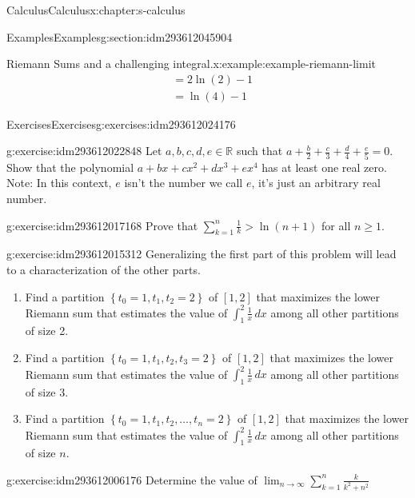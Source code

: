 \documentclass[twoside,10pt,]{book}
\numberwithin{equation}{section}
\begin{document}
\begin{chapterptx}{Calculus}{}{Calculus}{}{}{x:chapter:s-calculus}
\begin{sectionptx}{Examples}{}{Examples}{}{}{g:section:idm293612045904}
\begin{example}{Riemann Sums and a challenging integral.}{x:example:example-riemann-limit}
\begin{equation*}
\begin{split}
& = 2 \ln(2) - 1\\
& = \ln(4) - 1
\end{split}
\end{equation*}
%
\end{example}
\end{sectionptx}
%
%
\typeout{************************************************}
\typeout{************************************************}
%
\begin{exercises-section}{Exercises}{}{Exercises}{}{}{g:exercises:idm293612024176}
\begin{divisionexercise}{1}{}{}{g:exercise:idm293612022848}%
Let \(a,b,c,d,e \in \mathbb{R}\) such that \(a + \frac{b}{2} + \frac{c}{3} + \frac{d}{4} + \frac{e}{5} = 0\). Show that the polynomial \(a+bx+c x^2 +d x^3 +e x^4\) has at least one real zero. Note: In this context, \(e\) isn't the number we call \(e\), it's just an arbitrary real number.%
\end{divisionexercise}%
\begin{divisionexercise}{2}{}{}{g:exercise:idm293612017168}%
Prove that \(\sum _{k=1}^n \frac{1}{k}>\ln  (n+1)\)  for all \(n\geq 1\).%
\end{divisionexercise}%
\begin{divisionexercise}{3}{}{}{g:exercise:idm293612015312}%
Generalizing the first part of this problem will lead to a characterization of the other parts.%
\begin{enumerate}[label=(\alph*)]
\item{}Find a partition \(\left\{t_0=1,t_1,t_2=2\right\}\) of \([1,2]\) that maximizes the lower Riemann sum that estimates the value of \(\int_1^2 \frac{1}{x} \, dx\) among all other partitions of size 2.%
\item{}Find a partition \(\left\{t_0=1,t_1,t_2,t_3=2\right\}\) of \([1,2]\) that maximizes the lower Riemann sum that estimates the value of \(\int_1^2 \frac{1}{x} \, dx\) among all other partitions of size 3.%
\item{}Find a partition \(\left\{t_0=1,t_1,t_2,\ldots , t_n=2\right\}\) of \([1,2]\) that maximizes the lower Riemann sum that estimates the value of \(\int_1^2 \frac{1}{x} \, dx\) among all other partitions of size \(n\).%
\end{enumerate}
%
\end{divisionexercise}%
\begin{divisionexercise}{4}{}{}{g:exercise:idm293612006176}%
Determine the value of \(\lim _{n\to \infty }\sum _{k=1}^n \frac{k}{k^2+n^2}\)%

\end{divisionexercise}
\end{exercises-section}
\end{chapterptx}
\end{document}
